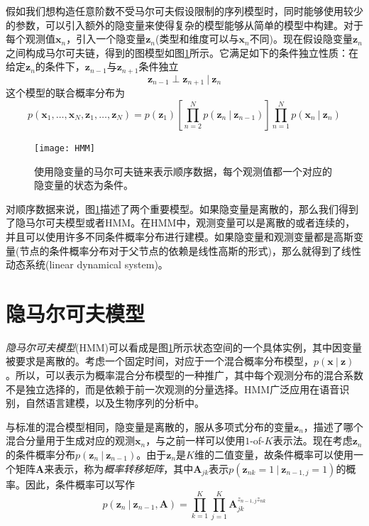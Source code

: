 \documentclass[11pt]{ctexbook}
\begin{document}
假如我们想构造任意阶数不受马尔可夫假设限制的序列模型时，同时能够使用较少的参数，可以引入额外的隐变量来使得复杂的模型能够从简单的模型中构建。对于每个观测值$\bm x_n$，引入一个隐变量$\bm z_n$(类型和维度可以与$\bm x_n$不同)。现在假设隐变量$\bm z_n$之间构成马尔可夫链，得到的图模型如图\ref{fig:HMM}所示。它满足如下的条件独立性质：在给定$\bm z_n$的条件下，$\bm z_{n-1}$与$\bm z_{n+1}$条件独立
\begin{equation}
	\bm z_{n-1} \perp \bm z_{n+1} \ |\ \bm z_n
\end{equation} 
这个模型的联合概率分布为
\begin{equation}
	p(\bm x_1, \ldots, \bm x_N, \bm z_1, \ldots, \bm z_N) = p(\bm z_1)\left [ \prod_{n=2}^{N}p(\bm z_n\ |\ \bm z_{n-1}) \right ]\prod_{n=1}^{N}p(\bm x_n\ |\ \bm z_n)
\end{equation}
\begin{figure}
	\centering
	\texttt{[image: HMM]}
	\caption{使用隐变量的马尔可夫链来表示顺序数据，每个观测值都一个对应的隐变量的状态为条件。}
	\label{fig:HMM}
\end{figure}

对顺序数据来说，图\ref{fig:HMM}描述了两个重要模型。如果隐变量是离散的，那么我们得到了隐马尔可夫模型或者HMM。在HMM中，观测变量可以是离散的或者连续的，并且可以使用许多不同条件概率分布进行建模。如果隐变量和观测变量都是高斯变量(节点的条件概率分布对于父节点的依赖是线性高斯的形式)，那么就得到了线性动态系统(linear dynamical system)。
\section{隐马尔可夫模型}
\emph{隐马尔可夫模型}(HMM)可以看成是图\ref{fig:HMM}所示状态空间的一个具体实例，其中因变量被要求是离散的。考虑一个固定时间，对应于一个混合概率分布模型，$p(\bm x\ |\ \bm z)$。所以，可以表示为概率混合分布模型的一种推广，其中每个观测分布的混合系数不是独立选择的，而是依赖于前一次观测的分量选择。HMM广泛应用在语音识别，自然语言建模，以及生物序列的分析中。

与标准的混合模型相同，隐变量是离散的，服从多项式分布的变量$\bm z_n$，描述了哪个混合分量用于生成对应的观测$\bm x_n$，与之前一样可以使用$1$-of-$K$表示法。现在考虑$\bm z_n$的条件概率分布$p(\bm z_n\ |\ \bm z_{n-1})$。由于$\bm z_n$是$K$维的二值变量，故条件概率可以使用一个矩阵$\bm A$来表示，称为\emph{概率转移矩阵}，其中$\bm A_{jk}$表示$p(\bm z_{nk}=1\ |\ \bm z_{n-1, j}=1)$的概率。因此，条件概率可以写作
\begin{equation}
	p(\bm z_n\ |\ \bm z_{n-1}, \bm A) = \prod_{k=1}^K\prod_{j=1}^K\bm A_{jk}^{z_{n-1,j}z_{nk}}
\end{equation}
\end{document}
